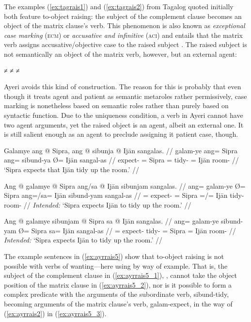 The examples (\ref{ex:tagrais1}) and (\ref{ex:tagrais2}) from Tagalog quoted
initially both feature to-object raising: the subject of the complement clause
becomes an object of the matrix clause's verb. This phenomenon is also known as
\emph{exceptional case marking} (\textsc{ecm}) or \emph{accusative and
infinitive} (\textsc{aci}) and entails that the matrix verb assigns
accusative/objective case to the raised subject \citep[439--442, 445, 451]
{carnie2013}. The raised subject is not semantically an object of the matrix
verb, however, but an external agent:

\pex
\a {} ≠ 
\a {} ≠ 
\a {} ≠ 
\xe

Ayeri avoids this kind of construction. The reason for this is probably that
even though it treats agent and patient as semantic metaroles rather
permissively, case marking is nonetheless based on semantic roles rather than
purely based on syntactic function. Due to the uniqueness condition, a verb in
Ayeri cannot have two agent arguments, yet the raised object is an agent,
albeit an external one. It is still salient enough as an agent to preclude
assigning it patient case, though.

\pex\label{ex:ayrrais5}
\a\label{ex:ayrrais5_1}\begingl
	\gla Galamye ang @ Sipra, ang @ sibunja {} @ Ijān sangalas. //
	\glb galam-ye ang= Sipra ang= sibund-ya Ø= Ijān sangal-as //
	\glc expect-\TsgF{} \Aarg{}= Sipra \AgtT{}= tidy-\TsgM{} \Top{}= Ijān
		room-\Parg{} //
	\glft `Sipra expects that Ijān tidy up the room.' //
\endgl

\a\label{ex:ayrrais5_2}\ljudge*\begingl
	\gla Ang @ galamye {} @ Sipra ang/sa @ Ijān sibunjam sangalas. //
	\glb ang= galam-ye Ø= Sipra ang=/sa= Ijān sibund-yam sangal-as //
	\glc \AgtT{}= expect-\TsgF{} \Top{}= Sipra \Aarg{}=/\Parg{}= Ijān
		tidy-\Ptcp{} room-\Parg{} //
	\glft \textit{Intended:} `Sipra expects Ijān to tidy up the room.' //
\endgl

\a\label{ex:ayrrais5_3}\ljudge*\begingl
	\gla Ang @ galamye sibunjam {} @ Sipra sa @ Ijān sangalas. //
	\glb ang= galam-ye sibund-yam Ø= Sipra sa= Ijān sangal-as //
	\glc \AgtT{}= expect-\TsgF{} tidy-\Ptcp{} \Top{}= Sipra \Parg{}= Ijān
		room-\Parg{} //
	\glft \textit{Intended:} `Sipra expects Ijān to tidy up the room.' //
\endgl

\xe

The example sentences in (\ref{ex:ayrrais5}) show that to-object raising is
not possible with verbs of wanting---here using  by
way of example. That is, the subject of the complement clause in
(\ref{ex:ayrrais5_1}), , cannot take the object position of
the matrix clause in (\ref{ex:ayrrais5_2}), nor is it possible to form a
complex predicate with the arguments of the subordinate verb, 
{sibund-}{tidy}, becoming arguments of the matrix clause's verb, 
{galam-}{expect}, in the way of (\ref{ex:ayrrais2}) in (\ref{ex:ayrrais5_3}).

